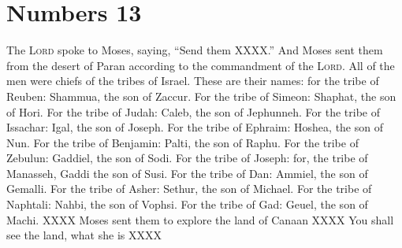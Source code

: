 \section{Numbers 13}\label{Numbers 13}
\begin{enumerate}[align=center]
     The \textsc{Lord} spoke to Moses, saying,%
     ``Send them XXXX.''%
     And Moses sent them from the desert of Paran according to the commandment of the \textsc{Lord}. All of the men were chiefs of the tribes of Israel.%
     These are their names: for the tribe of Reuben: Shammua, the son of Zaccur.%
     For the tribe of Simeon: Shaphat, the son of Hori.%
     For the tribe of Judah: Caleb, the son of Jephunneh.%
     For the tribe of Issachar: Igal, the son of Joseph.%
     For the tribe of Ephraim: Hoshea, the son of Nun.%
     For the tribe of Benjamin: Palti, the son of Raphu.%
     For the tribe of Zebulun: Gaddiel, the son of Sodi.%
     For the tribe of Joseph: for, the tribe of Manasseh, Gaddi the son of Susi.%
     For the tribe of Dan: Ammiel, the son of Gemalli.%
     For the tribe of Asher: Sethur, the son of Michael.%
     For the tribe of Naphtali: Nahbi, the son of Vophsi.%
     For the tribe of Gad: Geuel, the son of Machi.%
     XXXX%
     Moses sent them to explore the land of Canaan XXXX%
     You shall see the land, what she is XXXX%
\end{enumerate}
